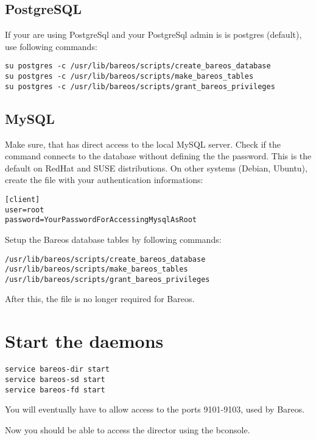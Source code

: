 \subsection{PostgreSQL}
If your are using PostgreSql and your PostgreSql admin is is postgres (default), use following commands:

\begin{verbatim}
su postgres -c /usr/lib/bareos/scripts/create_bareos_database
su postgres -c /usr/lib/bareos/scripts/make_bareos_tables
su postgres -c /usr/lib/bareos/scripts/grant_bareos_privileges
\end{verbatim}


\subsection{MySQL}
Make sure, that  has direct access to the local MySQL server. 
Check if the command  connects to the database without defining the the password. 
This is the default on RedHat and SUSE distributions. 
On other systems (Debian, Ubuntu),
create the file  with your authentication informations:
\begin{verbatim}
[client]
user=root
password=YourPasswordForAccessingMysqlAsRoot
\end{verbatim}

Setup the Bareos database tables by following commands:
\begin{verbatim}
/usr/lib/bareos/scripts/create_bareos_database
/usr/lib/bareos/scripts/make_bareos_tables
/usr/lib/bareos/scripts/grant_bareos_privileges
\end{verbatim}

After this, the file  is no longer required for Bareos.



\section{Start the daemons}
\begin{verbatim}
service bareos-dir start
service bareos-sd start
service bareos-fd start
\end{verbatim}

You will eventually have to allow access to the ports 9101-9103, used by Bareos.

Now you should be able to access the director using the bconsole.
